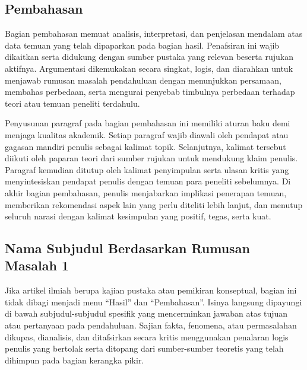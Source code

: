 \subsection{Pembahasan}

Bagian pembahasan memuat analisis, interpretasi, dan penjelasan mendalam atas data temuan yang telah dipaparkan pada bagian hasil. Penafsiran ini wajib dikaitkan serta didukung dengan sumber pustaka yang relevan beserta rujukan aktifnya. Argumentasi dikemukakan secara singkat, logis, dan diarahkan untuk menjawab rumusan masalah pendahuluan dengan menunjukkan persamaan, membahas perbedaan, serta mengurai penyebab timbulnya perbedaan terhadap teori atau temuan peneliti terdahulu.

Penyusunan paragraf pada bagian pembahasan ini memiliki aturan baku demi menjaga kualitas akademik. Setiap paragraf wajib diawali oleh pendapat atau gagasan mandiri penulis sebagai kalimat topik. Selanjutnya, kalimat tersebut diikuti oleh paparan teori dari sumber rujukan untuk mendukung klaim penulis. Paragraf kemudian ditutup oleh kalimat penyimpulan serta ulasan kritis yang menyintesiskan pendapat penulis dengan temuan para peneliti sebelumnya. Di akhir bagian pembahasan, penulis menjabarkan implikasi penerapan temuan, memberikan rekomendasi aspek lain yang perlu diteliti lebih lanjut, dan menutup seluruh narasi dengan kalimat kesimpulan yang positif, tegas, serta kuat.

\subsection{Nama Subjudul Berdasarkan Rumusan Masalah 1}

Jika artikel ilmiah berupa kajian pustaka atau pemikiran konseptual, bagian ini tidak dibagi menjadi menu ``Hasil'' dan ``Pembahasan''. Isinya langsung dipayungi di bawah subjudul-subjudul spesifik yang mencerminkan jawaban atas tujuan atau pertanyaan pada pendahuluan. Sajian fakta, fenomena, atau permasalahan dikupas, dianalisis, dan ditafsirkan secara kritis menggunakan penalaran logis penulis yang bertolak serta ditopang dari sumber-sumber teoretis yang telah dihimpun pada bagian kerangka pikir.